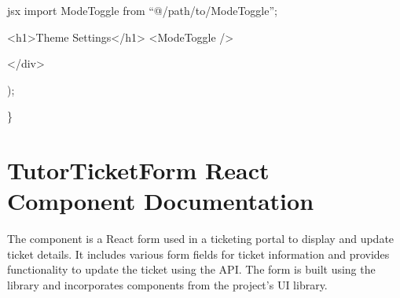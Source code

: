 \documentclass[letterpaper,10pt,english]{sphinxmanual}
\begin{document}
\sphinxAtStartPar
{\color{red}\bfseries{}\textasciigrave{}\textasciigrave{}}{\color{red}\bfseries{}\textasciigrave{}}jsx
import ModeToggle from “@/path/to/ModeToggle”;
\begin{description}
\begin{description}
\begin{description}
\sphinxAtStartPar
\textless{}h1\textgreater{}Theme Settings\textless{}/h1\textgreater{}
\textless{}ModeToggle /\textgreater{}

\end{description}

\sphinxAtStartPar
\textless{}/div\textgreater{}

\end{description}

\sphinxAtStartPar
);

\end{description}

\sphinxAtStartPar
\}

\sphinxstepscope


\section{TutorTicketForm React Component Documentation}
\label{\detokenize{forms/tutor:tutorticketform-react-component-documentation}}\label{\detokenize{forms/tutor::doc}}
\sphinxAtStartPar
The  component is a React form used in a ticketing portal to display and update ticket details. It includes various form fields for ticket information and provides functionality to update the ticket using the  API. The form is built using the  library and incorporates components from the project’s UI library.
\end{document}
